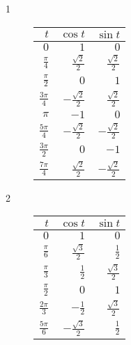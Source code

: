 \documentclass{exam}
\begin{document}
    \begin{description}

      \item[1]
        \begin{tabular}[H]{rrr}
          \toprule
          $t$ & $\cos t$ & $\sin t$ \\
          \midrule
          $0$               & $1$                    & $0$ \\
          $\frac{\pi}{4}$   & $\frac{\sqrt{2}}{2}$   & $\frac{\sqrt{2}}{2}$ \\

          \midrule
          $\frac{\pi}{2}$   & $0$                    & $1$ \\
          $\frac{3 \pi}{4}$ & $- \frac{\sqrt{2}}{2}$ & $\frac{\sqrt{2}}{2}$ \\

          \midrule
          $\pi$             & $-1$                   & $0$ \\
          $\frac{5 \pi}{4}$ & $-\frac{\sqrt{2}}{2}$  & $-\frac{\sqrt{2}}{2}$ \\

          \midrule
          $\frac{3 \pi}{2}$ & $0$                    & $-1$ \\
          $\frac{7 \pi}{4}$ & $\frac{\sqrt{2}}{2}$   & $-\frac{\sqrt{2}}{2}$ \\

          \bottomrule
        \end{tabular}

      \item[2]
        \begin{tabular}[H]{rrr}
          \toprule
          $t$ & $\cos t$ & $\sin t$ \\

          \midrule
          $0$             & $1$                  & $0$ \\
          $\frac{\pi}{6}$ & $\frac{\sqrt{3}}{2}$ & $\frac{1}{2}$ \\
          $\frac{\pi}{3}$ & $\frac{1}{2}$        & $\frac{\sqrt{3}}{2}$   \\

          \midrule
          $\frac{\pi}{2}$   & $0$                   & $1$ \\
          $\frac{2\pi}{3}$  & $-\frac{1}{2}$        & $\frac{\sqrt{3}}{2}$   \\
          $\frac{5 \pi}{6}$ & $-\frac{\sqrt{3}}{2}$ & $\frac{1}{2}$ \\


\end{tabular}
\end{description}
\end{document}

